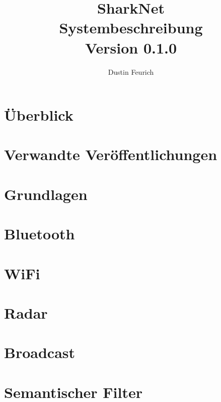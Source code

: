 \documentclass[german, 12pt]{book}
\begin{document}
	
\onehalfspacing

\title{SharkNet\\
Systembeschreibung \\
Version 0.1.0
}

\author{
Dustin Feurich
}

\maketitle

\tableofcontents

\chapter{Überblick}


\chapter{Verwandte Veröffentlichungen}


\chapter{Grundlagen}


\chapter{Bluetooth}


\chapter{WiFi}


\chapter{Radar}


\chapter{Broadcast}


\chapter{Semantischer Filter}

\end{document}
